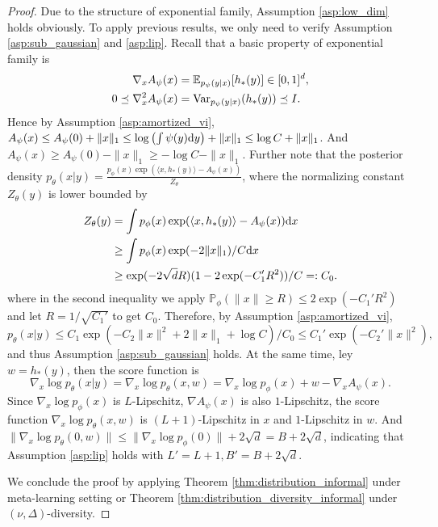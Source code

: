 \documentclass[11pt]{article}
\numberwithin{equation}{section}
\renewcommand{\P}{\mathbb{P}}
\begin{document}
\begin{proof}
    Due to the structure of exponential family, Assumption \ref{asp:low_dim} holds obviously.
    To apply previous results, we only need to verify Assumption \ref{asp:sub_gaussian} and \ref{asp:lip}.
    Recall that a basic property of exponential family is 
    \begin{align}
        \nabla_x A_\psi(x) &= \mathbb{E}_{p_\psi(y|x)}[h_*(y)]\in [0,1]^d,\\
        0\preceq \nabla_x^2 A_\psi(x) &= \mathrm{Var}_{ p_\psi(y|x)}(h_*(y)) \preceq I.
    \end{align}
    Hence by Assumption \ref{asp:amortized_vi}, $A_\psi(x)\leq A_\psi(0) + \|x\|_1\leq \log\left(\int \psi(y)\mathrm{d} y\right)+\|x\|_1\leq \log C+\|x\|_1$. And $A_\psi(x)\geq A_\psi(0) - \|x\|_1\geq -\log C-\|x\|_1$.
    Further note that the posterior density $p_\theta(x|y)=\frac{p_\phi(x)\exp(\langle x,h_*(y)\rangle-A_\psi(x))}{Z_\theta}$, where the normalizing constant $Z_\theta(y)$ is lower bounded by
    \begin{equation}
        \begin{aligned}
            Z_\theta(y) 
            &= \int p_\phi(x)\exp(\langle x,h_*(y)\rangle-A_\psi(x)) \mathrm{d} x \\
            &\geq \int p_\phi(x)\exp(-2\|x\|_1)/C \mathrm{d} x \\
            &\geq \exp(-2\sqrt{d}R)(1-2\exp(-C_1'R^2)) / C=: C_0.
        \end{aligned}
    \end{equation}
    where in the second inequality we apply $\P_\phi(\|x\|\geq R)\leq 2\exp(-C_1'R^2)$ and let $R=1/\sqrt{C_1'}$ to get $C_0$.
    Therefore, by Assumption \ref{asp:amortized_vi},
    \begin{equation}
        p_\theta(x|y)\leq C_1\exp(-C_2\|x\|^2+2\|x\|_1+\log C)/C_0
        \leq C_1'\exp(-C_2'\|x\|^2),
    \end{equation}
    and thus Assumption \ref{asp:sub_gaussian} holds.
    At the same time, ley $w=h_*(y)$, then the score function is
    \begin{equation}
        \nabla_x\log p_\theta(x|y)=\nabla_x\log p_\theta(x,w)=\nabla_x\log p_\phi(x)+w-\nabla_x A_\psi(x).
    \end{equation}
    Since $\nabla_x\log p_\phi(x)$ is $L$-Lipschitz, $\nabla A_\psi(x)$ is also $1$-Lipschitz, the score function $\nabla_x\log p_\theta(x,w)$ is $(L+1)$-Lipschitz in $x$ and $1$-Lipschitz in $w$.
    And $\|\nabla_x\log p_\theta(0,w)\|\leq \|\nabla_x\log p_\phi(0)\|+2\sqrt{d}=B+2\sqrt{d}$,
    indicating that Assumption \ref{asp:lip} holds with $L'=L+1,B'=B+2\sqrt{d}$.
    
    We conclude the proof by applying Theorem \ref{thm:distribution_informal} under meta-learning setting or Theorem \ref{thm:distribution_diversity_informal} under $(\nu,\Delta)$-diversity.
\end{proof}
\end{document}

